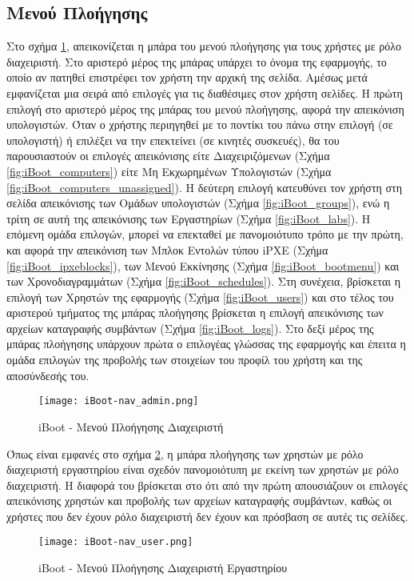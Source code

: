 \subsection{Μενού Πλοήγησης}
\FloatBarrier
Στο σχήμα \ref{fig:iBoot_nav_admin}, απεικονίζεται η μπάρα του μενού πλοήγησης για τους χρήστες με ρόλο διαχειριστή.
Στο αριστερό μέρος της μπάρας υπάρχει το όνομα της εφαρμογής, το οποίο αν πατηθεί επιστρέφει τον χρήστη την αρχική της σελίδα. Αμέσως μετά εμφανίζεται μια σειρά από επιλογές για τις διαθέσιμες στον χρήστη σελίδες.
Η πρώτη επιλογή στο αριστερό μέρος της μπάρας του μενού πλοήγησης, αφορά την απεικόνιση υπολογιστών. Όταν ο χρήστης περιηγηθεί με το ποντίκι του πάνω στην επιλογή (σε υπολογιστή) ή επιλέξει να την επεκτείνει (σε κινητές συσκευές), θα του παρουσιαστούν οι επιλογές απεικόνισης είτε Διαχειριζόμενων (Σχήμα \ref{fig:iBoot_computers}) είτε Μη Εκχωρημένων Υπολογιστών (Σχήμα \ref{fig:iBoot_computers_unassigned}).
Η δεύτερη επιλογή κατευθύνει τον χρήστη στη σελίδα απεικόνισης των Ομάδων υπολογιστών (Σχήμα \ref{fig:iBoot_groups}), ενώ η τρίτη σε αυτή της απεικόνισης των Εργαστηρίων (Σχήμα \ref{fig:iBoot_labs}).
Η επόμενη ομάδα επιλογών, μπορεί να επεκταθεί με πανομοιότυπο τρόπο με την πρώτη, και αφορά την απεικόνιση των Μπλοκ Εντολών τύπου iPXE (Σχήμα \ref{fig:iBoot_ipxeblocks}), των Μενού Εκκίνησης (Σχήμα \ref{fig:iBoot_bootmenu}) και των Χρονοδιαγραμμάτων (Σχήμα \ref{fig:iBoot_schedules}).
Στη συνέχεια, βρίσκεται η επιλογή των Χρηστών της εφαρμογής (Σχήμα \ref{fig:iBoot_users}) και στο τέλος του αριστερού τμήματος της μπάρας πλοήγησης βρίσκεται η επιλογή απεικόνισης των αρχείων καταγραφής συμβάντων (Σχήμα \ref{fig:iBoot_logs}).
Στο δεξί μέρος της μπάρας πλοήγησης υπάρχουν πρώτα ο επιλογέας γλώσσας της εφαρμογής και έπειτα η ομάδα επιλογών της προβολής των στοιχείων του προφίλ του χρήστη και της αποσύνδεσής του.

\begin{figure}[ht]
	\centering
	\texttt{[image: iBoot-nav\_admin.png]}
	\caption{iBoot - Μενού Πλοήγησης Διαχειριστή}
	\label{fig:iBoot_nav_admin}
\end{figure}

Όπως είναι εμφανές στο σχήμα \ref{fig:iBoot_nav_user}, η μπάρα πλοήγησης των χρηστών με ρόλο διαχειριστή εργαστηρίου είναι σχεδόν πανομοιότυπη με εκείνη των χρηστών με ρόλο διαχειριστή. Η διαφορά του βρίσκεται στο ότι από την πρώτη απουσιάζουν οι επιλογές απεικόνισης χρηστών και προβολής των αρχείων καταγραφής συμβάντων, καθώς οι χρήστες που δεν έχουν ρόλο διαχειριστή δεν έχουν και πρόσβαση σε αυτές τις σελίδες.
\begin{figure}[ht]
	\centering
	\texttt{[image: iBoot-nav\_user.png]}
	\caption{iBoot - Μενού Πλοήγησης Διαχειριστή Εργαστηρίου}
	\label{fig:iBoot_nav_user}
\end{figure}

